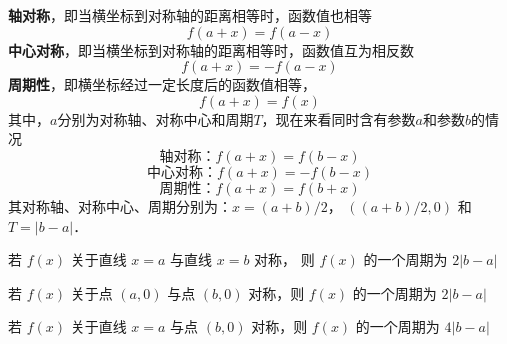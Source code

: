 
\textbf{轴对称}，即当横坐标到对称轴的距离相等时，函数值也相等
\begin{equation}
f\left( {a + x} \right) = f\left( {a - x} \right)
\end{equation}
\textbf{中心对称}，即当横坐标到对称轴的距离相等时，函数值互为相反数
\begin{equation}
f\left( {a + x} \right) =  - f\left( {a - x} \right)
\end{equation}
\textbf{周期性}，即横坐标经过一定长度后的函数值相等，
\begin{equation}
f\left( {a + x} \right) = f\left( x \right)
\end{equation}
其中，$a$分别为对称轴、对称中心和周期$T$，现在来看同时含有参数$a$和参数$b$的情况
\begin{equation}
\text{轴对称：} f\left( {a + x} \right) = f\left( {b - x} \right)
\end{equation}
\begin{equation}
\text{中心对称：} f\left( {a + x} \right) =  - f\left( {b - x} \right)
\end{equation}
\begin{equation}
\text{周期性：} f\left( {a + x} \right) = f\left( {b + x} \right)
\end{equation}
其对称轴、对称中心、周期分别为：$x = (a + b)/2$， $((a + b)/2, 0)$ 和 $T = \left| {b - a} \right|$．

若 $f(x)$ 关于直线 $x=a$ 与直线 $x=b$ 对称， 则 $f(x)$ 的一个周期为 $2\left| {b - a} \right|$

若 $f(x)$ 关于点 $(a,0)$ 与点 $(b,0)$ 对称，则 $f(x)$ 的一个周期为 $2\left| {b - a} \right|$

若 $f(x)$ 关于直线 $x=a$ 与点 $(b,0)$ 对称，则 $f(x)$ 的一个周期为 $4\left| {b - a} \right|$
